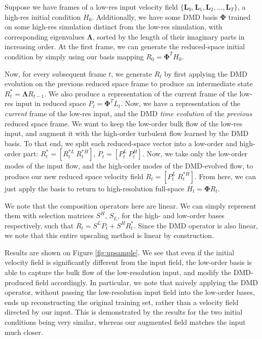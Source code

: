 Suppose we have frames of a low-res input velocity field $\{\bm{L}_0, \bm{L}_1, \bm{L}_2, \dots, \bm{L}_T\}$, a high-res initial condition $H_0$. Additionally, we have some DMD basis $\bm{\Phi}$ trained on some high-res simulation distinct from the low-res simulation, with corresponding eigenvalues $\bm{\Lambda}$, sorted by the length of their imaginary parts in increasing order. At the first frame, we can generate the reduced-space initial condition by simply using our basis mapping $R_0 = \bm{\Phi}^TH_0$.

Now, for every subsequent frame $t$, we generate $R_t$ by first applying the DMD evolution on the previous reduced space frame to produce an intermediate state $R^*_t=\bm{\Lambda}R_{t-1}$. We also produce a representation of the current frame of the low-res input in reduced space $P_t = \bm{\Phi}^TL_t$. Now, we have a representation of the \emph{current} frame of the low-res input, and the DMD \emph{time evolution} of the \emph{previous} reduced space frame. We want to keep the low-order bulk flow of the low-res input, and augment it with the high-order turbulent flow learned by the DMD basis. To that end, we split each reduced-space vector into a low-order and high-order part: $R^*_t = \left[R_t^{*L}\ R_t^{*H}\right]$, $P_t=\left[P_t^L\ P_t^H\right]$. Now, we take only the low-order modes of the input flow, and the high-order modes of the DMD-evolved flow, to produce our new reduced space velocity field $R_t=\left[P_t^L\ R_t^{*H}\right]$. From here, we can just apply the basis to return to high-resolution full-space $H_t=\bm{\Phi}R_t$.

We note that the composition operators here are linear. We can simply represent them with selection matrices $S^H$, $S_L$, for the high- and low-order bases respectively, such that $R_t=S^LP_t + S^HR_t^*$. Since the DMD operator is also linear, we note that this entire upscaling method is linear by construction.

Results are shown on Figure \ref{fig:upsample}. We see that even if the initial velocity field is significantly different from the input field, the low-order basis is able to capture the bulk flow of the low-resolution input, and modify the DMD-produced field accordingly. In particular, we note that naively applying the DMD operator, without passing the low-resolution input field into the low-order bases, ends up reconstructing the original training set, rather than a velocity field directed by our input. This is demonstrated by the results for the two initial conditions being very similar, whereas our augmented field matches the input much closer.

